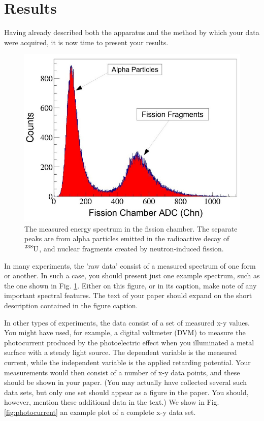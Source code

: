 \section{Results}\label{sec:results}

Having already described both the apparatus and the method by which your data were acquired, it is now time to present your results.

\begin{figure}[ht]
    \centering
    \includegraphics[width=0.8\linewidth]{figures/fission_spectrum.png}
    \caption{\footnotesize The measured energy spectrum in the fission chamber. The separate peaks are from alpha particles emitted in the radioactive decay of $\prescript{238}{}{\text{U}}$, and nuclear fragments created by neutron-induced fission.\cite{Kov_22}}
    \label{fig:fission_spectrum}
\end{figure}

In many experiments, the 'raw data' consist of a measured spectrum of one form or another. In such a case, you should present just one example spectrum, such as the one shown in Fig. \ref{fig:fission_spectrum}. Either on this figure, or in its caption, make note of any important spectral features. The text of your paper should expand on the short description contained in the figure caption.

In other types of experiments, the data consist of a set of measured x-y values. You might have used, for example, a digital voltmeter (DVM) to measure the photocurrent produced by the photoelectric effect when you illuminated a metal surface with a steady light source. The dependent variable is the measured current, while the independent variable is the applied retarding potential. Your measurements would then consist of a number of x-y data points, and these should be shown in your paper. (You may actually have collected several such data sets, but only one set should appear as a figure in the paper. You should, however, mention these additional data in the text.) We show in Fig. \ref{fig:photocurrent} an example plot of a complete x-y data set.

